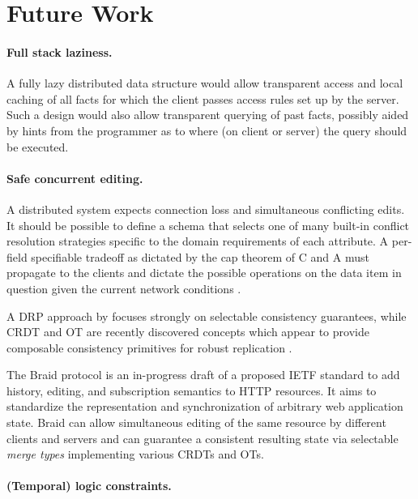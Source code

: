 \cleardoublepage
\section{Future Work}

\paragraph{Full stack laziness.} A fully lazy distributed data structure would allow transparent access and local caching of all facts for which the client passes access rules set up by the server. Such a design would also allow transparent querying of past facts, possibly aided by hints from the programmer as to where (on client or server) the query should be executed.

\paragraph{Safe concurrent editing.}
A distributed system expects connection loss and simultaneous conflicting edits. It should be possible to define a schema that selects one of many built-in conflict resolution strategies specific to the domain requirements of each attribute. A per-field specifiable tradeoff as dictated by the \gls{cap} theorem of C and A must propagate to the clients and dictate the possible operations on the data item in question given the current network conditions \cite{emerick2014api}.


A \gls{DRP} approach by \cite{margara2014we} focuses strongly on selectable consistency guarantees, while \gls{CRDT} and \gls{OT} are recently discovered concepts which appear to provide composable consistency primitives for robust replication \cite{weilbach2015replikativ, weilbach2016decoupling}.

The Braid protocol \cite{braid19} is an in-progress draft of a proposed \gls{IETF} standard to add history, editing, and subscription semantics to HTTP resources. It aims to standardize the representation and synchronization of arbitrary web application state. Braid can allow simultaneous editing of the same resource by different clients and servers and can guarantee a consistent resulting state via selectable \emph{merge types} implementing various CRDTs and OTs.


\paragraph{(Temporal) logic constraints.}

